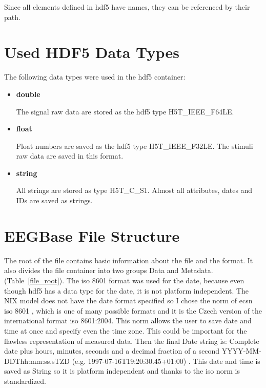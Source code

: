 Since all elements defined in \gls{hdf5} have names, they can be referenced by their path. \cite{pandora2}

\section{Used HDF5 Data Types}

The following data types were used in the \gls{hdf5} container:

\begin{itemize}
	\item \textbf{double} 
	
	The signal raw data are stored as the \gls{hdf5} type H5T\_IEEE\_F64LE.
	\item \textbf{float}
	
	Float numbers are saved as the \gls{hdf5} type H5T\_IEEE\_F32LE. The stimuli raw data are saved in this format.
	\item \textbf{string} 
	
	All strings are stored as type H5T\_C\_S1. Almost all attributes, dates and IDs are saved as strings.
	
\end{itemize}

\section{EEGBase File Structure}

The root of the file contains basic information about the file and the format. It also divides the file container into two groups Data and Metadata. (Table~\ref{file_root}). The \gls{iso} 8601 format was used for the date, because even though \gls{hdf5} has a data type for the date, it is not platform independent. The NIX model does not have the date format specified so I chose the norm of \gls{ecsn} \gls{iso} 8601 \cite{iso8601}, which is one of many possible formats and it is the Czech version of the international format \gls{iso} 8601:2004. This norm allows the user to save date and time at once and specify even the time zone. This could be important for the flawless representation of measured data. Then the final Date string is: Complete date plus hours, minutes, seconds and a decimal fraction of a second YYYY-MM-DDThh:mm:ss.sTZD (e.g. 1997-07-16T19:20:30.45+01:00) \cite{iso8601}. This date and time is saved as String so it is platform independent and thanks to the \gls{iso} norm is standardized.


